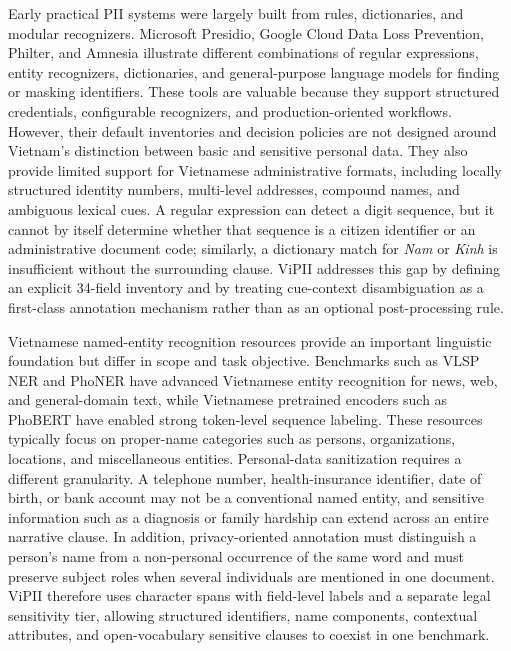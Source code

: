 \documentclass[
]{article}
\begin{document}
Early practical PII systems were largely built from rules, dictionaries,
and modular recognizers. Microsoft Presidio, Google Cloud Data Loss
Prevention, Philter, and Amnesia illustrate different combinations of
regular expressions, entity recognizers, dictionaries, and
general-purpose language models for finding or masking identifiers.
These tools are valuable because they support structured credentials,
configurable recognizers, and production-oriented workflows. However,
their default inventories and decision policies are not designed around
Vietnam's distinction between basic and sensitive personal data. They
also provide limited support for Vietnamese administrative formats,
including locally structured identity numbers, multi-level addresses,
compound names, and ambiguous lexical cues. A regular expression can
detect a digit sequence, but it cannot by itself determine whether that
sequence is a citizen identifier or an administrative document code;
similarly, a dictionary match for \emph{Nam} or \emph{Kinh} is
insufficient without the surrounding clause. ViPII addresses this gap by
defining an explicit 34-field inventory and by treating cue-context
disambiguation as a first-class annotation mechanism rather than as an
optional post-processing rule.

Vietnamese named-entity recognition resources provide an important
linguistic foundation but differ in scope and task objective. Benchmarks
such as VLSP NER and PhoNER have advanced Vietnamese entity recognition
for news, web, and general-domain text, while Vietnamese pretrained
encoders such as PhoBERT have enabled strong token-level sequence
labeling. These resources typically focus on proper-name categories such
as persons, organizations, locations, and miscellaneous entities.
Personal-data sanitization requires a different granularity. A telephone
number, health-insurance identifier, date of birth, or bank account may
not be a conventional named entity, and sensitive information such as a
diagnosis or family hardship can extend across an entire narrative
clause. In addition, privacy-oriented annotation must distinguish a
person's name from a non-personal occurrence of the same word and must
preserve subject roles when several individuals are mentioned in one
document. ViPII therefore uses character spans with field-level labels
and a separate legal sensitivity tier, allowing structured identifiers,
name components, contextual attributes, and open-vocabulary sensitive
clauses to coexist in one benchmark.
\end{document}

